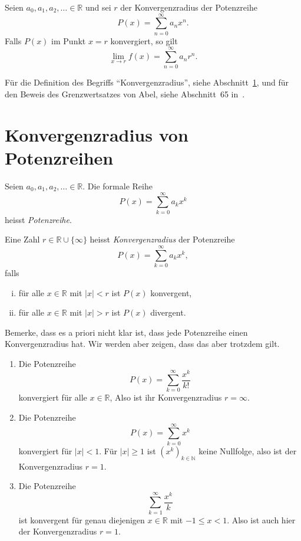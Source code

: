 \documentclass[../main.tex]{subfiles}
\begin{document}
\begin{theorem*}
  Seien $a_0, a_1, a_2, \dots \in \mathbb{R}$ und
  sei $r$ der Konvergenzradius der Potenzreihe
  \[
    P(x) = \sum_{n=0}^{\infty} a_n x^n.
  \]
  Falls $P(x)$ im Punkt $x = r$ konvergiert, so gilt
  \[
    \lim_{x \to r} f(x) = \sum_{n=0}^{\infty} a_n r^n.
  \]
\end{theorem*}

Für die Definition des Begriffs ``Konvergenzradius'',
siehe Abschnitt~\ref{sec:radius}, und
für den Beweis des Grenzwertsatzes von Abel,
siehe Abschnitt~65 in~\cite{heuser}.


\section{Konvergenzradius von Potenzreihen}\label{sec:radius}
Seien $a_0, a_1, a_2, \dots \in \mathbb{R}$.
Die formale Reihe
\[
  P(x) = \sum_{k=0}^{\infty} a_k x^k
\]
heisst \emph{Potenzreihe}.

\begin{definition}
  Eine Zahl $r \in \mathbb{R} \cup \{\infty\}$ heisst
  \emph{Konvergenzradius} der Potenzreihe 
  \[
    P(x) = \sum_{k=0}^{\infty} a_k x^k,
  \]
  falls
  \begin{enumerate}[(i)]
    \item für alle $x \in \mathbb{R}$ mit $|x| < r$ ist $P(x)$ konvergent,
    \item für alle $x \in \mathbb{R}$ mit $|x| > r$ ist $P(x)$ divergent.
  \end{enumerate}
\end{definition}

Bemerke, dass es a priori nicht klar ist, dass jede Potenzreihe
einen Konvergenzradius hat. Wir werden aber zeigen, dass das aber trotzdem gilt.

\begin{examples}
  \leavevmode
  \begin{enumerate}[(1)]
    \item Die Potenzreihe
      \[
        P(x) = \sum_{k=0}^{\infty} \frac{x^k}{k!}
      \]
      konvergiert für alle $x \in \mathbb{R}$, 
      Also ist ihr Konvergenzradius $r = \infty$.
    \item Die Potenzreihe
      \[
        P(x) = \sum_{k=0}^{\infty} x^k
      \]
      konvergiert für $|x| < 1$. Für $|x| \geq 1$ ist ${(x^{k})}_{k \in \mathbb{N}}$ keine
      Nullfolge, also ist der Konvergenzradius $r = 1$.
    \item Die Potenzreihe
      \[
        \sum_{k=1}^{\infty} \frac{x^k}{k}
      \]
      ist konvergent für genau diejenigen $x \in \mathbb{R}$ mit $-1 \leq x < 1$.
      Also ist auch hier der Konvergenzradius $r = 1$.
  \end{enumerate}
\end{examples}
\end{document}
